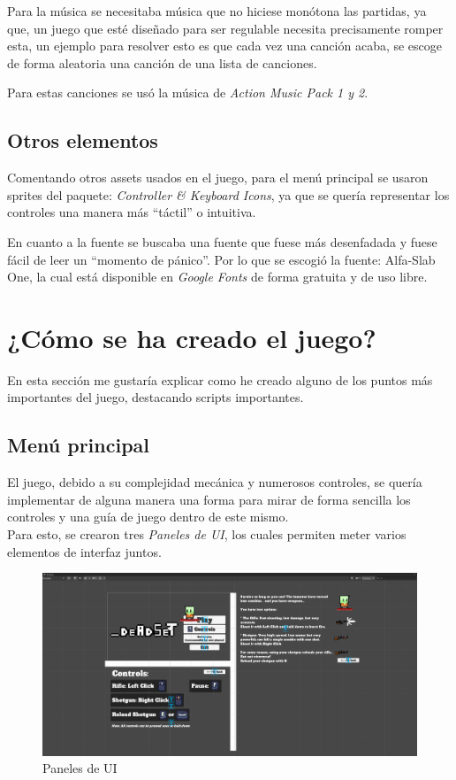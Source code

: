 \documentclass[12pt]{article}
\begin{document}
        Para la música se necesitaba música que no hiciese monótona las partidas, ya que, un juego que esté diseñado para ser regulable necesita precisamente romper esta, un ejemplo para resolver esto es que cada vez una canción acaba, se escoge de forma aleatoria una canción de una lista de canciones. 
        
        Para estas canciones se usó la música de \textit{Action Music Pack 1 y 2}.
        
    \subsection{Otros elementos}
    
        Comentando otros assets usados en el juego, para el menú principal se usaron sprites del paquete: \textit{Controller \& Keyboard Icons}, ya que se quería representar los controles una manera más “táctil” o intuitiva.
        
        En cuanto a la fuente se buscaba una fuente que fuese más desenfadada y fuese fácil de leer un “momento de pánico”. Por lo que se escogió la fuente: Alfa-Slab One, la cual está disponible en \textit{Google Fonts} de forma gratuita y de uso libre.

\section{¿Cómo se ha creado el juego?}
    En esta sección me gustaría explicar como he creado alguno de los puntos más importantes del juego, destacando scripts importantes. 
    \subsection{Menú principal}
        El juego, debido a su complejidad mecánica y numerosos controles, se quería implementar de alguna manera una forma para mirar de forma sencilla los controles y una guía de juego dentro de este mismo.\\

        Para esto, se crearon tres \textit{Paneles de UI}, los cuales permiten meter varios elementos de interfaz juntos.\\
        \begin{figure}[H]
            \centering
            \includegraphics[width=\textwidth]{Images/Menuprincipal/Paneles.png}
            \caption{Paneles de UI}
        \end{figure}
\end{document}

